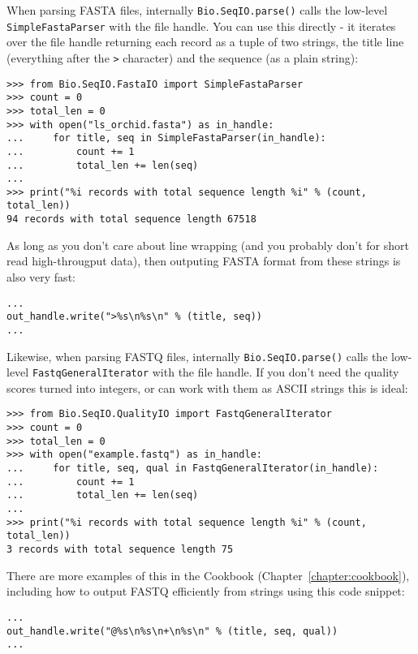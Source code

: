 When parsing FASTA files, internally \verb|Bio.SeqIO.parse()| calls
the low-level \verb|SimpleFastaParser| with the file handle.
You can use this directly - it iterates over the file handle returning
each record as a tuple of two strings, the title line (everything after
the \verb|>| character) and the sequence (as a plain string):

\begin{verbatim}
>>> from Bio.SeqIO.FastaIO import SimpleFastaParser
>>> count = 0
>>> total_len = 0
>>> with open("ls_orchid.fasta") as in_handle:
...     for title, seq in SimpleFastaParser(in_handle):
...         count += 1
...         total_len += len(seq)
...
>>> print("%i records with total sequence length %i" % (count, total_len))
94 records with total sequence length 67518
\end{verbatim}

As long as you don't care about line wrapping (and you probably don't
for short read high-througput data), then outputing FASTA format from
these strings is also very fast:

\begin{verbatim}
...
out_handle.write(">%s\n%s\n" % (title, seq))
...
\end{verbatim}

Likewise, when parsing FASTQ files, internally \verb|Bio.SeqIO.parse()|
calls the low-level \verb|FastqGeneralIterator| with the file handle.
If you don't need the quality scores turned into integers,
or can work with them as ASCII strings this is ideal:

\begin{verbatim}
>>> from Bio.SeqIO.QualityIO import FastqGeneralIterator
>>> count = 0
>>> total_len = 0
>>> with open("example.fastq") as in_handle:
...     for title, seq, qual in FastqGeneralIterator(in_handle):
...         count += 1
...         total_len += len(seq)
...
>>> print("%i records with total sequence length %i" % (count, total_len))
3 records with total sequence length 75
\end{verbatim}

There are more examples of this in the Cookbook (Chapter~\ref{chapter:cookbook}),
including how to output FASTQ efficiently from strings using this code snippet:

\begin{verbatim}
...
out_handle.write("@%s\n%s\n+\n%s\n" % (title, seq, qual))
...
\end{verbatim}
